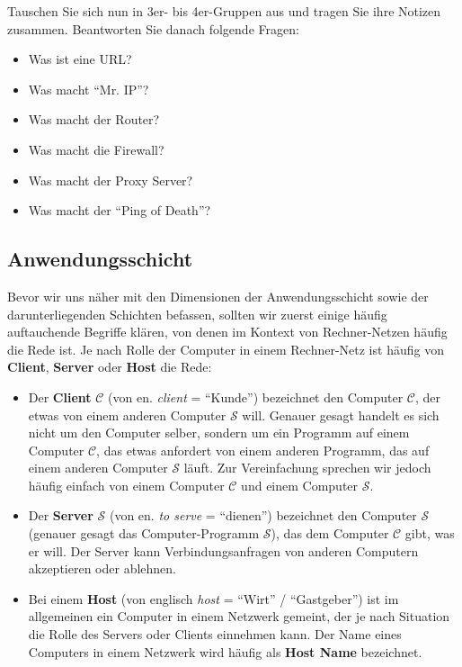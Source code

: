 \begin{myexercise}
	Tauschen Sie sich nun in 3er- bis 4er-Gruppen aus und tragen Sie ihre Notizen zusammen. Beantworten Sie danach folgende Fragen:
	\begin{itemize}
		\item Was ist eine URL?
		\item Was macht ``Mr. IP''?
		\item Was macht der Router?
		\item Was macht die Firewall?
		\item Was macht der Proxy Server?
		\item Was macht der ``Ping of Death''? \faSkull
	\end{itemize}
\end{myexercise}

\subsection{Anwendungsschicht}

Bevor wir uns näher mit den Dimensionen der Anwendungsschicht sowie der darunterliegenden Schichten befassen, sollten wir zuerst einige häufig auftauchende Begriffe klären, von denen im Kontext von Rechner-Netzen häufig die Rede ist. Je nach Rolle der Computer in einem Rechner-Netz ist häufig von \textbf{Client}, \textbf{Server} oder \textbf{Host} die Rede:
\begin{itemize}
	\item Der \textbf{Client} $\mathcal{C}$ (von en. \textit{client} = ``Kunde'') bezeichnet den Computer $\mathcal{C}$, der etwas von einem anderen Computer $\mathcal{S}$ will. Genauer gesagt handelt es sich nicht um den Computer selber, sondern um ein Programm auf einem Computer $\mathcal{C}$, das etwas anfordert von einem anderen Programm, das auf einem anderen Computer $\mathcal{S}$ läuft. Zur Vereinfachung sprechen wir jedoch häufig einfach von einem Computer $\mathcal{C}$ und einem Computer $\mathcal{S}$.
	\item Der \textbf{Server} $\mathcal{S}$ (von en. \textit{to serve} = ``dienen'') bezeichnet  den Computer $\mathcal{S}$ (genauer gesagt das Computer-Programm $\mathcal{S}$), das dem Computer $\mathcal{C}$ gibt, was er will. Der Server kann Verbindungsanfragen von anderen Computern akzeptieren oder ablehnen.
	\item Bei einem \textbf{Host} (von englisch \textit{host} = ``Wirt'' / ``Gastgeber'') ist im allgemeinen ein Computer in einem Netzwerk gemeint, der je nach Situation die Rolle des Servers oder Clients einnehmen kann. Der Name eines Computers in einem Netzwerk wird häufig als \textbf{Host Name} bezeichnet.
\end{itemize}


